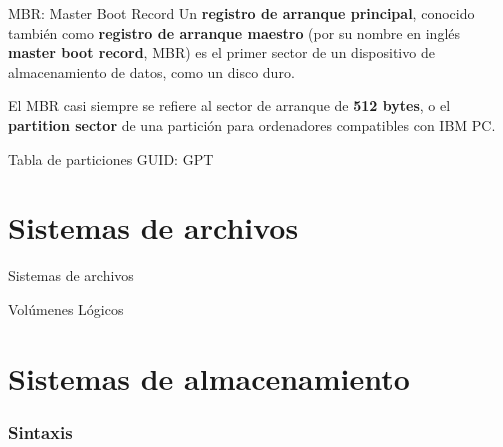 \begin{frame}[c]{MBR: Master Boot Record}
  Un \textbf{registro de arranque principal}, conocido también como
  \textbf{registro de arranque maestro} (por su nombre en inglés
  \textbf{master boot record}, MBR) es el
  primer sector de un dispositivo de almacenamiento de datos, como un disco
  duro.

  \vspace{\baselineskip}
  El MBR casi siempre se refiere al sector de arranque de \textbf{512 bytes},
  o el \textbf{partition sector} de una partición para ordenadores
  compatibles con IBM PC.

  \vspace{\baselineskip}
  \begin{center}
  \end{center}
\end{frame}

\begin{frame}[c]{Tabla de particiones GUID: GPT}

\end{frame}

\section{Sistemas de archivos}

\begin{frame}[c]{Sistemas de archivos}

\end{frame}

\begin{frame}[c]{Volúmenes Lógicos}

\end{frame}

\section{Sistemas de almacenamiento}

\begin{frame}[fragile]
  \frametitle{Sintaxis}

  \vspace{\baselineskip}
\end{frame}
